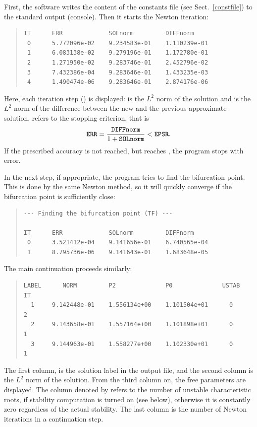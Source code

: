 \documentclass[10pt,a4paper]{ddedoc}
\begin{document}
First, the software writes the content of the constants file (see Sect.\
\ref{constfile}) to the standard output (console). Then it starts the Newton
iteration:
{ \small \begin{quote} \begin{lstlisting}[basicstyle=\tt,frame=single]
IT      ERR             SOLnorm         DIFFnorm
 0      5.772096e-02    9.234583e-01    1.110239e-01
 1      6.083138e-02    9.279196e-01    1.172780e-01
 2      1.271950e-02    9.283746e-01    2.452796e-02
 3      7.432386e-04    9.283646e-01    1.433235e-03
 4      1.490474e-06    9.283646e-01    2.874176e-06
\end{lstlisting} \end{quote} } \noindent
Here, each iteration step () is displayed:  is the $L^2$
norm of the solution and \funp{DIFFnorm} is the $L^2$ norm of the difference
between the new and the previous approximate solution. \funp{ERR} refers to the
stopping criterion, that is
\[
	{\tt ERR} = \frac{{\tt DIFFnorm}}{1+{\tt SOLnorm}} < {\tt EPSR}.
\]
If the prescribed accuracy is not reached, but  reaches ,
the program stops with error.

In the next step, if appropriate, the program tries to find the bifurcation
point. This is done by the same Newton method, so it will quickly converge if
the bifurcation point is sufficiently close:
{ \small \begin{quote} \begin{lstlisting}[basicstyle=\tt,frame=single]
--- Finding the bifurcation point (TF) ---

IT      ERR             SOLnorm         DIFFnorm
 0      3.521412e-04    9.141656e-01    6.740565e-04
 1      8.795736e-06    9.141643e-01    1.683648e-05
\end{lstlisting} \end{quote} } \noindent

The main continuation proceeds similarly:
{ \small \begin{quote} \begin{lstlisting}[basicstyle=\tt,frame=single]
LABEL      NORM         P2              P0              USTAB   IT
  1     9.142448e-01    1.556134e+00    1.101504e+01      0     2
  2     9.143658e-01    1.557164e+00    1.101898e+01      0     1
  3     9.144963e-01    1.558277e+00    1.102330e+01      0     1
\end{lstlisting} \end{quote} } \noindent
The first column,  is the solution label in the output file, and
the second column is the $L^2$ norm of the solution. From the third column on,
the free parameters are displayed. The column denoted by \funp{USTAB} refers to
the number of unstable characteristic roots, if stability computation is turned
on (see \funp{STAB} below), otherwise it is constantly zero regardless of the actual stability. 
The last column is the number of Newton iterations in a continuation step.
\end{document}
